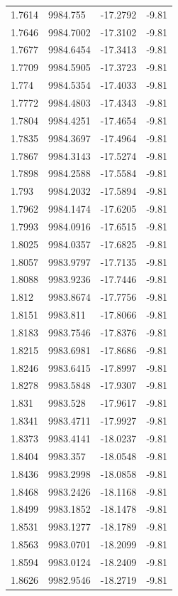 \begin{table}[H]
\begin{tabular}{llll}
1.7614 & 9984.755 & -17.2792 & -9.81 \\
1.7646 & 9984.7002 & -17.3102 & -9.81 \\
1.7677 & 9984.6454 & -17.3413 & -9.81 \\
1.7709 & 9984.5905 & -17.3723 & -9.81 \\
1.774 & 9984.5354 & -17.4033 & -9.81 \\
1.7772 & 9984.4803 & -17.4343 & -9.81 \\
1.7804 & 9984.4251 & -17.4654 & -9.81 \\
1.7835 & 9984.3697 & -17.4964 & -9.81 \\
1.7867 & 9984.3143 & -17.5274 & -9.81 \\
1.7898 & 9984.2588 & -17.5584 & -9.81 \\
1.793 & 9984.2032 & -17.5894 & -9.81 \\
1.7962 & 9984.1474 & -17.6205 & -9.81 \\
1.7993 & 9984.0916 & -17.6515 & -9.81 \\
1.8025 & 9984.0357 & -17.6825 & -9.81 \\
1.8057 & 9983.9797 & -17.7135 & -9.81 \\
1.8088 & 9983.9236 & -17.7446 & -9.81 \\
1.812 & 9983.8674 & -17.7756 & -9.81 \\
1.8151 & 9983.811 & -17.8066 & -9.81 \\
1.8183 & 9983.7546 & -17.8376 & -9.81 \\
1.8215 & 9983.6981 & -17.8686 & -9.81 \\
1.8246 & 9983.6415 & -17.8997 & -9.81 \\
1.8278 & 9983.5848 & -17.9307 & -9.81 \\
1.831 & 9983.528 & -17.9617 & -9.81 \\
1.8341 & 9983.4711 & -17.9927 & -9.81 \\
1.8373 & 9983.4141 & -18.0237 & -9.81 \\
1.8404 & 9983.357 & -18.0548 & -9.81 \\
1.8436 & 9983.2998 & -18.0858 & -9.81 \\
1.8468 & 9983.2426 & -18.1168 & -9.81 \\
1.8499 & 9983.1852 & -18.1478 & -9.81 \\
1.8531 & 9983.1277 & -18.1789 & -9.81 \\
1.8563 & 9983.0701 & -18.2099 & -9.81 \\
1.8594 & 9983.0124 & -18.2409 & -9.81 \\
1.8626 & 9982.9546 & -18.2719 & -9.81 \\

\end{tabular}
\end{table}

